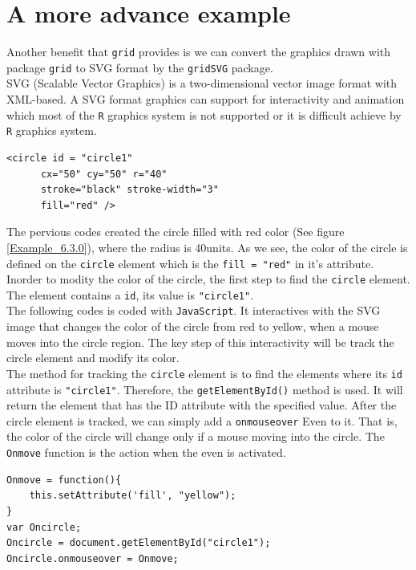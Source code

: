 \documentclass[paper=a4, fontsize=11pt]{report}
\begin{document}
\newpage
\section{A more advance example}
Another benefit that \texttt{grid} provides is we can convert the graphics drawn with package \texttt{grid} to SVG format by the \texttt{gridSVG} package.\\
SVG (Scalable Vector Graphics) is a two-dimensional vector image format with XML-based. A SVG format graphics can support for interactivity and animation which most of the \texttt{R} graphics system is not supported or it is difficult achieve by \texttt{R} graphics system.\\

\begin{lstlisting}
<circle id = "circle1" 
      cx="50" cy="50" r="40" 
      stroke="black" stroke-width="3" 
      fill="red" />
\end{lstlisting}

The pervious codes created the circle filled with red color (See figure \ref{Example_6.3.0}), where the radius is 40units. As we see, the color of the circle is defined on the \texttt{circle} element which is the \texttt{fill = "red"} in it's attribute. Inorder to modity the color of the circle, the first step to find the \texttt{circle} element. The element contains a \texttt{id}, its value is \texttt{"circle1"}.\\

The following codes is coded with \texttt{JavaScript}. It interactives with the SVG image that changes the color of the circle from red to yellow, when a mouse moves into the circle region. The key step of this interactivity will be track the circle element and modify its color.\\

The method for tracking the \texttt{circle} element is to find the elements where its \texttt{id} attribute is \texttt{"circle1"}. Therefore, the \texttt{getElementById()} method is used. It will return the element that has the ID attribute with the specified value. After the circle element is tracked, we can simply add a \texttt{onmouseover} Even to it. That is, the color of the circle will change only if a mouse moving into the circle. The \texttt{Onmove} function is the action when the even is activated.\\ 

\begin{lstlisting}
Onmove = function(){
    this.setAttribute('fill', "yellow");
}
var Oncircle;
Oncircle = document.getElementById("circle1");
Oncircle.onmouseover = Onmove;
\end{lstlisting}
\end{document}
